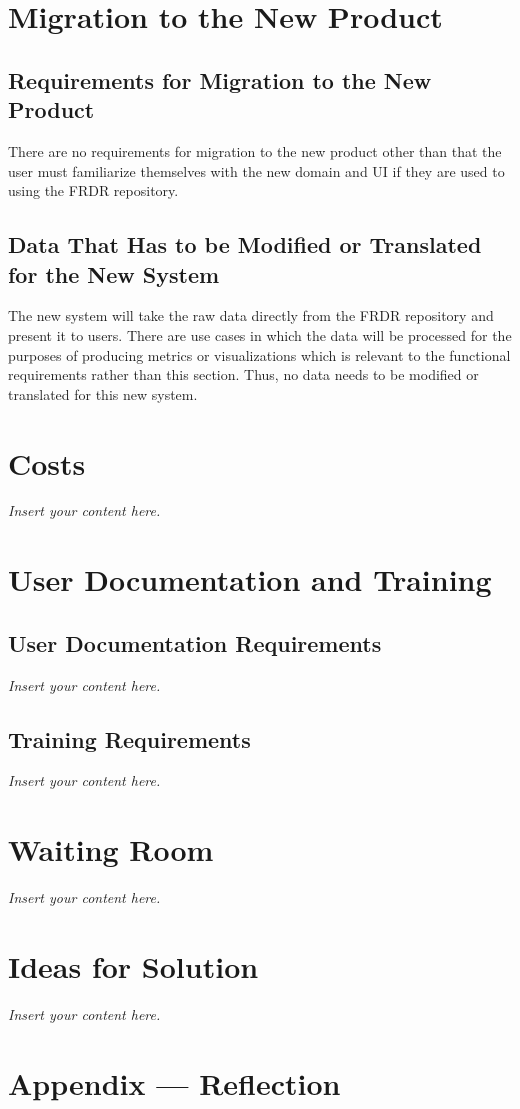 \documentclass[12pt]{article}
\newcommand{\lips}{\textit{Insert your content here.}}
\begin{document}
\section{Migration to the New Product}
\subsection{Requirements for Migration to the New Product}

\par{There are no requirements for migration to the new product other than that the user must familiarize themselves with the new domain and UI if they are used to using the FRDR repository.}


\subsection{Data That Has to be Modified or Translated for the New System}

\par{The new system will take the raw data directly from the FRDR repository and present it to users. There are use cases in which the data will be processed for the purposes 
     of producing metrics or visualizations which is relevant to the functional requirements rather than this section. Thus, no data needs to be modified or translated for this new system.}

\section{Costs}
\lips
\section{User Documentation and Training}
\subsection{User Documentation Requirements}
\lips
\subsection{Training Requirements}
\lips

\section{Waiting Room}
\lips

\section{Ideas for Solution}
\lips

\newpage{}
\section*{Appendix --- Reflection}




\end{document}
